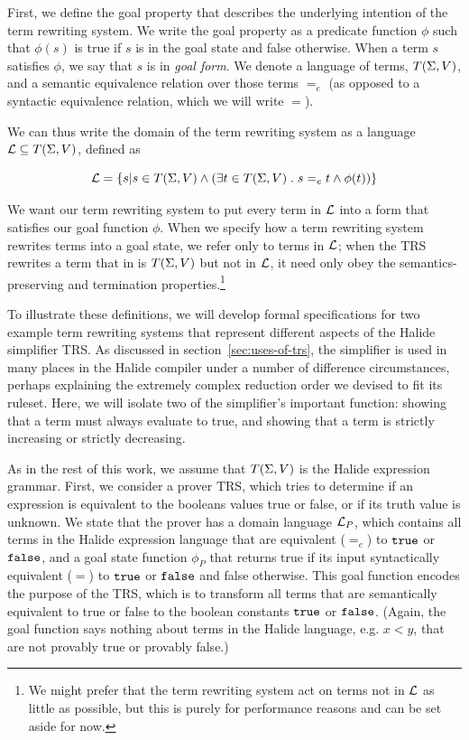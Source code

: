 First, we define the goal property that describes the underlying intention of the term rewriting system. We write the goal property as a predicate function $\phi$ such that $\phi(s)$ is true if $s$ is in the goal state and false otherwise. When a term $s$ satisfies $\phi$, we say that $s$ is in \emph{goal form}. We denote a language of terms, $T(\Sigma,V)$, and a semantic equivalence relation over those terms $=_e$ (as opposed to a syntactic equivalence relation, which we will write $=$).  

We can thus write the domain of the term rewriting system as a language $\mathcal{L} \subseteq T(\Sigma,V)$, defined as

\[
\mathcal{L} = \{s | s \in T(\Sigma,V) \wedge (\exists t \in T(\Sigma,V)\;.\; s =_e t \wedge \phi(t))\}
\]

We want our term rewriting system to put every term in $\mathcal{L}$ into a form that satisfies our goal function $\phi$. When we specify how a term rewriting system rewrites terms into a goal state, we refer only to terms in $\mathcal{L}$; when the TRS rewrites a term that in is $T(\Sigma,V)$ but not in $\mathcal{L}$, it need only obey the semantics-preserving and termination properties.\footnote{We might prefer that the term rewriting system act on terms not in $\mathcal{L}$ as little as possible, but this is purely for performance reasons and can be set aside for now.}

To illustrate these definitions, we will develop formal specifications for two example term rewriting systems that represent different aspects of the Halide simplifier TRS. As discussed in section~\ref{sec:uses-of-trs}, the simplifier is used in many places in the Halide compiler under a number of difference circumstances, perhaps explaining the extremely complex reduction order we devised to fit its ruleset. Here, we will isolate two of the simplifier's important function: showing that a term must always evaluate to true, and showing that a term is strictly increasing or strictly decreasing.

 As in the rest of this work, we assume that $T(\Sigma,V)$ is the Halide expression grammar. First, we consider a prover TRS, which tries to determine if an expression is equivalent to the booleans values true or false, or if its truth value is unknown. We state that the prover has a domain language $\mathcal{L}_P$, which contains all terms in the Halide expression language that are equivalent ($=_e$) to $\texttt{true}$ or $\texttt{false}$, and a goal state function $\phi_P$ that returns true if its input syntactically equivalent ($=$) to $\texttt{true}$ or $\texttt{false}$ and false otherwise. This goal function encodes the purpose of the TRS, which is to transform all terms that are semantically equivalent to true or false to the boolean constants $\texttt{true}$ or $\texttt{false}$. (Again, the goal function says nothing about terms in the Halide language, e.g. $x < y$, that are not provably true or provably false.)

